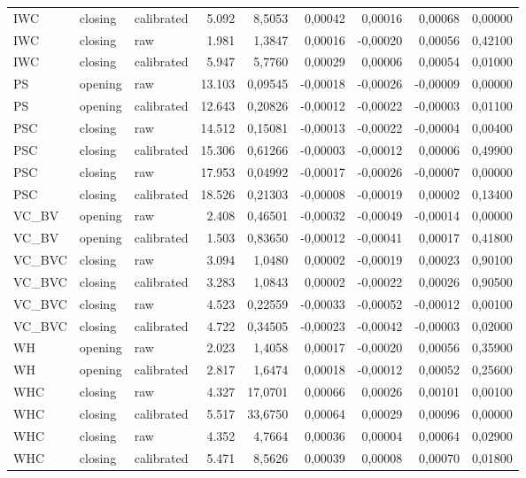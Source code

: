 {\begin{longtable}{@{}lllrrrrrr@{}}
IWC & closing & calibrated & 5.092 & 8,5053 & 0,00042 & 0,00016 & 0,00068 & 0,00000 \\
IWC & closing & raw & 1.981 & 1,3847 & 0,00016 & -0,00020 & 0,00056 & 0,42100 \\
IWC & closing & calibrated & 5.947 & 5,7760 & 0,00029 & 0,00006 & 0,00054 & 0,01000 \\
PS & opening & raw & 13.103 & 0,09545 & -0,00018 & -0,00026 & -0,00009 & 0,00000 \\
PS & opening & calibrated & 12.643 & 0,20826 & -0,00012 & -0,00022 & -0,00003 & 0,01100 \\
PSC & closing & raw & 14.512 & 0,15081 & -0,00013 & -0,00022 & -0,00004 & 0,00400 \\
PSC & closing & calibrated & 15.306 & 0,61266 & -0,00003 & -0,00012 & 0,00006 & 0,49900 \\
PSC & closing & raw & 17.953 & 0,04992 & -0,00017 & -0,00026 & -0,00007 & 0,00000 \\
PSC & closing & calibrated & 18.526 & 0,21303 & -0,00008 & -0,00019 & 0,00002 & 0,13400 \\
VC\_BV & opening & raw & 2.408 & 0,46501 & -0,00032 & -0,00049 & -0,00014 & 0,00000 \\
VC\_BV & opening & calibrated & 1.503 & 0,83650 & -0,00012 & -0,00041 & 0,00017 & 0,41800 \\
VC\_BVC & closing & raw & 3.094 & 1,0480 & 0,00002 & -0,00019 & 0,00023 & 0,90100 \\
VC\_BVC & closing & calibrated & 3.283 & 1,0843 & 0,00002 & -0,00022 & 0,00026 & 0,90500 \\
VC\_BVC & closing & raw & 4.523 & 0,22559 & -0,00033 & -0,00052 & -0,00012 & 0,00100 \\
VC\_BVC & closing & calibrated & 4.722 & 0,34505 & -0,00023 & -0,00042 & -0,00003 & 0,02000 \\
WH & opening & raw & 2.023 & 1,4058 & 0,00017 & -0,00020 & 0,00056 & 0,35900 \\
WH & opening & calibrated & 2.817 & 1,6474 & 0,00018 & -0,00012 & 0,00052 & 0,25600 \\
WHC & closing & raw & 4.327 & 17,0701 & 0,00066 & 0,00026 & 0,00101 & 0,00100 \\
WHC & closing & calibrated & 5.517 & 33,6750 & 0,00064 & 0,00029 & 0,00096 & 0,00000 \\
WHC & closing & raw & 4.352 & 4,7664 & 0,00036 & 0,00004 & 0,00064 & 0,02900 \\
WHC & closing & calibrated & 5.471 & 8,5626 & 0,00039 & 0,00008 & 0,00070 & 0,01800 \\
\end{longtable}
}

